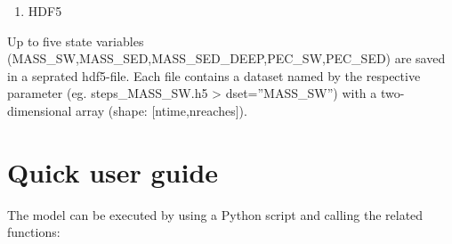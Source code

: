 \documentclass[letterpaper,10pt,english]{sphinxmanual}
\begin{document}
\begin{figure}[htbp]
\centering

\noindent{}
\end{figure}
\begin{enumerate}
\def\theenumi{\arabic{enumi}}
\def\labelenumi{\theenumi )}
\makeatletter\def\p@enumii{\p@enumi \theenumi )}\makeatother
\setcounter{enumi}{1}
\item {} 
HDF5

\end{enumerate}

Up to five state variables (MASS\_SW,MASS\_SED,MASS\_SED\_DEEP,PEC\_SW,PEC\_SED)
are saved in a seprated hdf5-file. Each file contains a dataset named by the respective
parameter (eg. steps\_MASS\_SW.h5 \textendash{}\textgreater{} dset=”MASS\_SW”) with a two-dimensional array
(shape: {[}ntime,nreaches{]}).


\chapter{Quick user guide}
\label{\detokenize{index:quick-user-guide}}
The model can be executed by using a Python script and calling the related functions:
\end{document}
